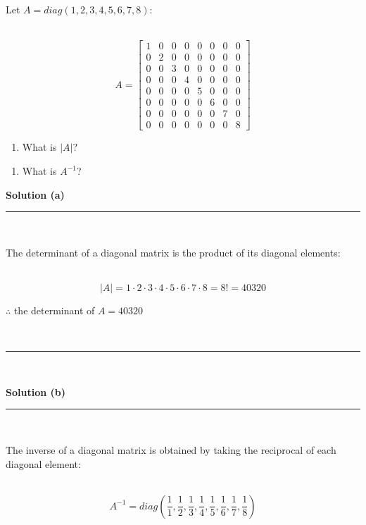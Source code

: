 \documentclass{article}
\begin{document}
\parbox{\textwidth}{Let $A= diag(1,2,3,4,5,6,7,8)$:}\\

$$A = \begin{bmatrix}
    1 & 0 & 0 & 0 & 0 & 0 & 0 & 0 \\
    0 & 2 & 0 & 0 & 0 & 0 & 0 & 0 \\
    0 & 0 & 3 & 0 & 0 & 0 & 0 & 0 \\
    0 & 0 & 0 & 4 & 0 & 0 & 0 & 0 \\
    0 & 0 & 0 & 0 & 5 & 0 & 0 & 0 \\
    0 & 0 & 0 & 0 & 0 & 6 & 0 & 0 \\
    0 & 0 & 0 & 0 & 0 & 0 & 7 & 0 \\
    0 & 0 & 0 & 0 & 0 & 0 & 0 & 8
\end{bmatrix}$$

\begin{enumerate}[label=(a)]
    \item What is $|A|$?
\end{enumerate}

\begin{enumerate}[label=(b)]
    \item What is $A^{-1}$?
\end{enumerate}

\parbox{\textwidth}{\textbf{Solution (a)}}
\noindent\rule{\textwidth}{0.4pt}\\
\parbox{\textwidth}{The determinant of a diagonal matrix is the product of its diagonal elements:}\\

$$|A| = 1 \cdot 2 \cdot 3 \cdot 4 \cdot 5 \cdot 6 \cdot 7 \cdot 8 = 8! = 40320$$

\parbox{\textwidth}{$\therefore$ the determinant of $A= 40320$}\\

\noindent\rule{\textwidth}{0.4pt}\\
\parbox{\textwidth}{\textbf{Solution (b)}}
\noindent\rule{\textwidth}{0.4pt}\\
\parbox{\textwidth}{The inverse of a diagonal matrix is obtained by taking the reciprocal of each diagonal element:}\\
$$A^{-1} = diag\left(\frac{1}{1}, \frac{1}{2}, \frac{1}{3}, \frac{1}{4}, \frac{1}{5}, \frac{1}{6}, \frac{1}{7}, \frac{1}{8}\right)$$
\end{document}
